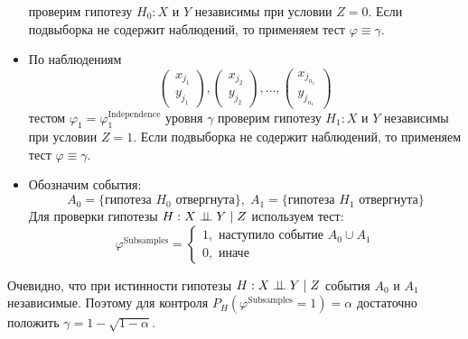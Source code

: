 \begin{itemize}
проверим гипотезу $H_0 : X$ и $Y$ независимы при условии $Z=0$.
Если подвыборка не содержит наблюдений, то применяем тест 
$\varphi \equiv \gamma$.
\item По наблюдениям 
    $$
    \begin{pmatrix}
        x_{j_1} \\
        y_{j_1} 
    \end{pmatrix},
    \begin{pmatrix}
        x_{j_2} \\
        y_{j_2}
    \end{pmatrix}, \ldots,
    \begin{pmatrix}
        x_{j_{n_1}} \\
        y_{j_{n_1}}
    \end{pmatrix}
    $$
тестом $\varphi_1=\varphi^{\text{Independence}}_1$ уровня $\gamma$
проверим гипотезу $H_1 : X$ и $Y$ независимы при условии $Z=1$.
Если подвыборка не содержит наблюдений, то применяем тест 
$\varphi \equiv \gamma$.
\item Обозначим события:
$$A_0 = \{\text{гипотеза $H_0$ отвергнута}\},\;
A_1 = \{\text{гипотеза $H_1$ отвергнута}\}$$
Для проверки гипотезы $H: X \perp\!\!\!\perp Y \mid Z$ используем тест:
$$
\varphi^{\text{Subsamples}}=\begin{cases}
    1, \text{ наступило событие $A_0 \cup A_1$}\\
    0, \text{ иначе}
\end{cases}
$$
\end{itemize}
Очевидно, что при истинности гипотезы $H: X \perp\!\!\!\perp Y \mid Z$
события $A_0$ и $A_1$ независимые. Поэтому для контроля
$P_{H}(\varphi^{\text{Subsamples}}=1)=\alpha$ достаточно положить
$\gamma = 1 - \sqrt{1-\alpha}$.



